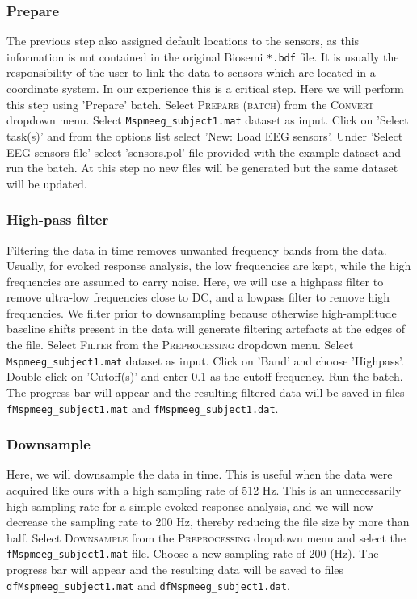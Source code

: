 \subsubsection{Prepare}
The previous step also assigned default locations to the sensors, as this information is not contained in the original Biosemi \texttt{*.bdf} file. It is usually the responsibility of the user to link the data to sensors which are located in a coordinate system. In our experience this is a critical step. Here we will perform this step using 'Prepare' batch. Select \textsc{Prepare (batch)} from the \textsc{Convert} dropdown menu. Select \texttt{Mspmeeg\_subject1.mat} dataset as input. Click on 'Select task(s)' and from the options list select 'New: Load EEG sensors'. Under 'Select EEG sensors file' select 'sensors.pol' file provided with the example dataset and run the batch. At this step no new files will be generated but the same dataset will be updated.

\subsubsection{High-pass filter}
Filtering the data in time removes unwanted frequency bands from the data. Usually, for evoked response analysis, the low frequencies are kept, while the high frequencies are assumed to carry noise. Here, we will use a highpass filter to remove ultra-low frequencies close to DC, and a lowpass filter to remove high frequencies. We filter prior to downsampling because otherwise high-amplitude baseline shifts present in the data will generate filtering artefacts at the edges of the file. Select \textsc{Filter} from the \textsc{Preprocessing} dropdown menu. Select \texttt{Mspmeeg\_subject1.mat} dataset as input.  Click on 'Band' and choose 'Highpass'. Double-click on 'Cutoff(s)' and enter 0.1 as the cutoff frequency. Run the batch. The progress bar will appear and the resulting filtered data will be saved in files \texttt{fMspmeeg\_subject1.mat} and \texttt{fMspmeeg\_subject1.dat}. 

\subsubsection{Downsample}
Here, we will downsample the data in time. This is useful when the data were acquired like ours with a high sampling rate of 512 Hz. This is an unnecessarily high sampling rate for a simple evoked response analysis, and we will now decrease the sampling rate to 200 Hz, thereby reducing the file size by more than half.  Select \textsc{Downsample} from the  \textsc{Preprocessing} dropdown menu and select the \texttt{fMspmeeg\_subject1.mat} file. Choose a new sampling rate of 200 (Hz). The progress bar will appear and the resulting data will be saved to files \texttt{dfMspmeeg\_subject1.mat} and \texttt{dfMspmeeg\_subject1.dat}.

